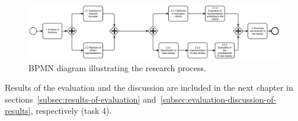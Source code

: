 \begin{figure}
    \centering
    \includegraphics[width=\textwidth]{./3-research-methodology/research-process}
    \caption{BPMN diagram illustrating the research process.}
    \label{fig:research-process}
\end{figure}

Results of the evaluation and the discussion are included in the next chapter in sections~\ref{subsec:results-of-evaluation} and~\ref{subsec:evaluation-discussion-of-results}, respectively (task 4).

